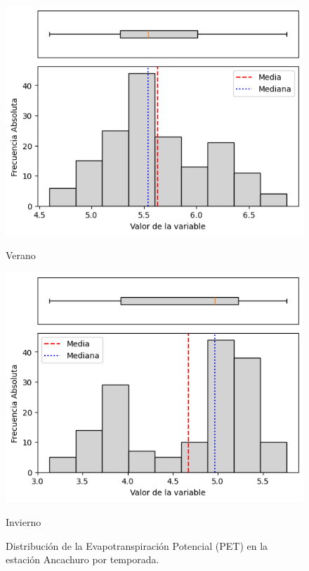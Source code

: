 \begin{figure}[H]
\begin{minipage}{0.30\textwidth}
    \centering
    \includegraphics[width=\linewidth]{resultados/por_estacion_del_anio/Ancachuro/PET_HistBoxplot_Summer.png}
    \caption*{Verano}
\end{minipage}
\hfill
\begin{minipage}{0.30\textwidth}
    \centering
    \includegraphics[width=\linewidth]{resultados/por_estacion_del_anio/Ancachuro/PET_HistBoxplot_Winter.png}
    \caption*{Invierno}
\end{minipage}
\caption{Distribución de la Evapotranspiración Potencial (PET) en la estación Ancachuro por temporada.}
\label{fig:pet_hist_ancachuro}
\end{figure}

